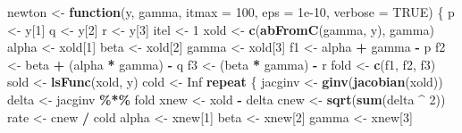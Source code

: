 \documentclass[
  12pt,
]{article}
\newenvironment{Shaded}{\begin{snugshade}}{\end{snugshade}}
\newcommand{\AttributeTok}[1]{\textcolor[rgb]{0.13,0.29,0.53}{#1}}
\newcommand{\ConstantTok}[1]{\textcolor[rgb]{0.56,0.35,0.01}{#1}}
\newcommand{\ControlFlowTok}[1]{\textcolor[rgb]{0.13,0.29,0.53}{\textbf{#1}}}
\newcommand{\DecValTok}[1]{\textcolor[rgb]{0.00,0.00,0.81}{#1}}
\newcommand{\FloatTok}[1]{\textcolor[rgb]{0.00,0.00,0.81}{#1}}
\newcommand{\FunctionTok}[1]{\textcolor[rgb]{0.13,0.29,0.53}{\textbf{#1}}}
\newcommand{\NormalTok}[1]{#1}
\newcommand{\OtherTok}[1]{\textcolor[rgb]{0.56,0.35,0.01}{#1}}
\newcommand{\SpecialCharTok}[1]{\textcolor[rgb]{0.81,0.36,0.00}{\textbf{#1}}}
\begin{document}
\begin{Shaded}
\begin{Highlighting}[]
\NormalTok{newton }\OtherTok{\textless{}{-}} \ControlFlowTok{function}\NormalTok{(y,}
\NormalTok{                   gamma,}
                   \AttributeTok{itmax =} \DecValTok{100}\NormalTok{,}
                   \AttributeTok{eps =} \FloatTok{1e{-}10}\NormalTok{,}
                   \AttributeTok{verbose =} \ConstantTok{TRUE}\NormalTok{) \{}
\NormalTok{  p }\OtherTok{\textless{}{-}}\NormalTok{ y[}\DecValTok{1}\NormalTok{]}
\NormalTok{  q }\OtherTok{\textless{}{-}}\NormalTok{ y[}\DecValTok{2}\NormalTok{]}
\NormalTok{  r }\OtherTok{\textless{}{-}}\NormalTok{ y[}\DecValTok{3}\NormalTok{]}
\NormalTok{  itel }\OtherTok{\textless{}{-}} \DecValTok{1}
\NormalTok{  xold }\OtherTok{\textless{}{-}} \FunctionTok{c}\NormalTok{(}\FunctionTok{abFromC}\NormalTok{(gamma, y), gamma)}
\NormalTok{  alpha }\OtherTok{\textless{}{-}}\NormalTok{ xold[}\DecValTok{1}\NormalTok{]}
\NormalTok{  beta }\OtherTok{\textless{}{-}}\NormalTok{ xold[}\DecValTok{2}\NormalTok{]}
\NormalTok{  gamma }\OtherTok{\textless{}{-}}\NormalTok{ xold[}\DecValTok{3}\NormalTok{]}
\NormalTok{  f1 }\OtherTok{\textless{}{-}}\NormalTok{ alpha }\SpecialCharTok{+}\NormalTok{ gamma }\SpecialCharTok{{-}}\NormalTok{ p}
\NormalTok{  f2 }\OtherTok{\textless{}{-}}\NormalTok{ beta }\SpecialCharTok{+}\NormalTok{ (alpha }\SpecialCharTok{*}\NormalTok{ gamma) }\SpecialCharTok{{-}}\NormalTok{ q}
\NormalTok{  f3 }\OtherTok{\textless{}{-}}\NormalTok{ (beta }\SpecialCharTok{*}\NormalTok{ gamma) }\SpecialCharTok{{-}}\NormalTok{ r}
\NormalTok{  fold }\OtherTok{\textless{}{-}} \FunctionTok{c}\NormalTok{(f1, f2, f3)}
\NormalTok{  sold }\OtherTok{\textless{}{-}} \FunctionTok{lsFunc}\NormalTok{(xold, y)}
\NormalTok{  cold }\OtherTok{\textless{}{-}} \ConstantTok{Inf}
  \ControlFlowTok{repeat}\NormalTok{ \{}
\NormalTok{    jacginv }\OtherTok{\textless{}{-}} \FunctionTok{ginv}\NormalTok{(}\FunctionTok{jacobian}\NormalTok{(xold))}
\NormalTok{    delta }\OtherTok{\textless{}{-}}\NormalTok{ jacginv }\SpecialCharTok{\%*\%}\NormalTok{ fold}
\NormalTok{    xnew }\OtherTok{\textless{}{-}}\NormalTok{ xold }\SpecialCharTok{{-}}\NormalTok{ delta}
\NormalTok{    cnew }\OtherTok{\textless{}{-}} \FunctionTok{sqrt}\NormalTok{(}\FunctionTok{sum}\NormalTok{(delta }\SpecialCharTok{\^{}} \DecValTok{2}\NormalTok{))}
\NormalTok{    rate }\OtherTok{\textless{}{-}}\NormalTok{ cnew }\SpecialCharTok{/}\NormalTok{ cold}
\NormalTok{    alpha }\OtherTok{\textless{}{-}}\NormalTok{ xnew[}\DecValTok{1}\NormalTok{]}
\NormalTok{    beta }\OtherTok{\textless{}{-}}\NormalTok{ xnew[}\DecValTok{2}\NormalTok{]}
\NormalTok{    gamma }\OtherTok{\textless{}{-}}\NormalTok{ xnew[}\DecValTok{3}\NormalTok{]}

\end{Highlighting}
\end{Shaded}
\end{document}
